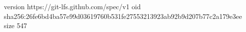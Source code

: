 version https://git-lfs.github.com/spec/v1
oid sha256:26fe6bd4ba57e99d03619760b531fe27553213923ab92b9d207b77c2a179e3ee
size 547
